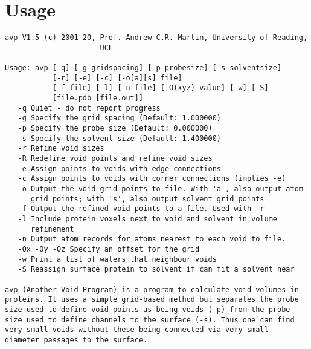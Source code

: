 \documentclass{article}
\begin{document}
\section{Usage}

\vspace{1em}

\setlength{\fboxrule}{2pt}
\setlength{\fboxsep}{2mm}
\vspace{1em}



\begin{verbatim}
avp V1.5 (c) 2001-20, Prof. Andrew C.R. Martin, University of Reading,
                      UCL

Usage: avp [-q] [-g gridspacing] [-p probesize] [-s solventsize]
           [-r] [-e] [-c] [-o[a][s] file] 
           [-f file] [-l] [-n file] [-O(xyz) value] [-w] [-S] 
           [file.pdb [file.out]]
   -q Quiet - do not report progress
   -g Specify the grid spacing (Default: 1.000000)
   -p Specify the probe size (Default: 0.000000)
   -s Specify the solvent size (Default: 1.400000)
   -r Refine void sizes
   -R Redefine void points and refine void sizes
   -e Assign points to voids with edge connections
   -c Assign points to voids with corner connections (implies -e)
   -o Output the void grid points to file. With 'a', also output atom
      grid points; with 's', also output solvent grid points
   -f Output the refined void points to a file. Used with -r
   -l Include protein voxels next to void and solvent in volume 
      refinement
   -n Output atom records for atoms nearest to each void to file.
   -Ox -Oy -Oz Specify an offset for the grid
   -w Print a list of waters that neighbour voids
   -S Reassign surface protein to solvent if can fit a solvent near

avp (Another Void Program) is a program to calculate void volumes in
proteins. It uses a simple grid-based method but separates the probe
size used to define void points as being voids (-p) from the probe
size used to define channels to the surface (-s). Thus one can find
very small voids without these being connected via very small 
diameter passages to the surface.
\end{verbatim}
\end{document}
